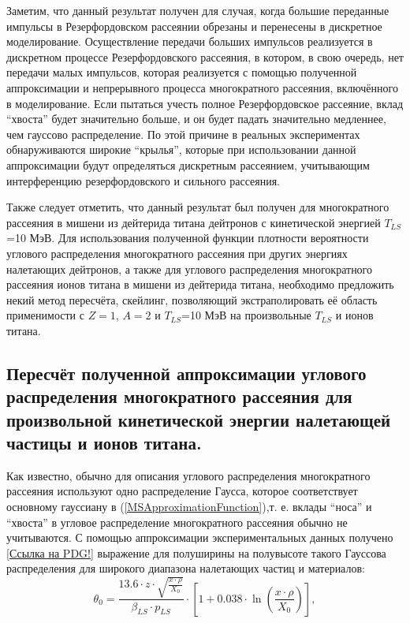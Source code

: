 \documentclass[a4paper,12pt]{article}
\begin{document}
\begin{large}
	Заметим, что данный результат получен для случая, когда большие переданные импульсы в Резерфордовском рассеянии обрезаны и перенесены в дискретное моделирование.
	Осуществление передачи больших импульсов реализуется в дискретном процессе Резерфордовского рассеяния, в котором, в свою очередь, нет передачи малых импульсов, которая реализуется с помощью полученной аппроксимации и непрерывного процесса многократного рассеяния, включённого в моделирование.
  	Если пытаться учесть полное Резерфордовское рассеяние, вклад ``хвоста'' будет значительно больше, и он будет падать значительно медленнее, чем гауссово распределение.
  	По этой причине в реальных экспериментах обнаруживаются широкие ``крылья'', которые при использовании данной аппроксимации будут определяться дискретным рассеянием, учитывающим интерференцию резерфордовского и сильного рассеяния.
  
  	Также следует отметить, что данный результат был получен для многократного рассеяния в мишени из дейтерида титана дейтронов с кинетической энергией $T_{LS}$=10 МэВ.
  	Для использования полученной функции плотности вероятности углового распределения многократного рассеяния при других энергиях налетающих дейтронов, а также для углового распределения многократного рассеяния ионов титана в мишени из дейтерида титана, необходимо предложить некий метод пересчёта, скейлинг, позволяющий экстраполировать её область применимости с $Z=1$, $A=2$ и $T_{LS}$=10 МэВ на произвольные $T_{LS}$ и ионов титана.
  
\subsection{Пересчёт полученной аппроксимации углового распределения многократного рассеяния для произвольной кинетической энергии налетающей частицы и ионов титана.}
\label{subValMS2}

	Как известно, обычно для описания углового распределения многократного рассеяния используют одно распределение Гаусса, которое соответствует основному гауссиану в  (\ref{MSApproximationFunction}),т. е. вклады ``носа'' и ``хвоста'' в угловое распределение многократного рассеяния обычно не учитываются.
	С помощью аппроксимации экспериментальных данных получено [\underline{Ссылка на PDG!}] выражение для полуширины на полувысоте такого Гауссова распределения для широкого диапазона налетающих частиц и материалов:
\begin{equation}
  \label{Theta0}
  \theta_0=\frac{13.6 \cdot z \cdot \sqrt{\frac{x\cdot \rho}{X_0}}}{\beta_{LS}\cdot p_{LS}}\cdot\left[ 1+0.038\cdot\ln\left(\frac{x\cdot \rho}{X_0}\right)\right],
\end{equation}	


\end{large}
\end{document}
